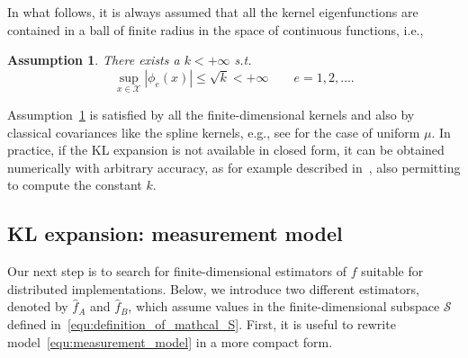 \documentclass[10pt,twocolumn,twoside]{IEEEtran}					%
\newcounter{generalCounter}
\theoremstyle	{plain}
\newtheorem		{assumption}	[generalCounter]	{Assumption}
\newcommand	{\Assumption}			[0]	{Assumption}
\begin{document}
In what follows, it is always assumed that all the kernel eigenfunctions are contained in a ball of finite radius in the space of continuous functions, i.e.,
%
\begin{assumption}
	There exists a $k < +\infty$ s.t.
	\begin{equation}
		\sup_{x \in \mathcal{X}}
		\left| \phi_{e}(x) \right|
		\leq
		\sqrt{k}
		<
		+\infty 
		\qquad
		e = 1, 2, \ldots .
		\label{equ:eigenfunctions_are_uniformly_bounded}
	\end{equation}
	\label{ass:eigenfunctions_are_uniformly_bounded}
\end{assumption}

\Assumption~\ref{ass:eigenfunctions_are_uniformly_bounded} is satisfied by all the finite-dimensional kernels and also by classical covariances like the spline kernels, e.g., see \cite{Bell2004} for the case of uniform $\mu$. In practice, if the \ac{KL} expansion is not available in closed form, it can be obtained numerically with arbitrary accuracy, as for example described in~\cite{de1999consistent}, also permitting to compute the constant $k$.
 
\subsection{KL expansion: measurement model}
\label{sec:finite-dimensional_approximations_of_the_bayesian_estimator}

Our next step is to search for finite-dimensional estimators of $f$ suitable for distributed implementations. Below, we introduce two different estimators, denoted by $\widehat{f}_{A}$ and $\widehat{f}_{B}$, which assume values in the finite-dimensional subspace $\mathcal{S}$ defined in~\eqref{equ:definition_of_mathcal_S}. First, it is useful to rewrite model~\eqref{equ:measurement_model} in a more compact form.
\end{document}
